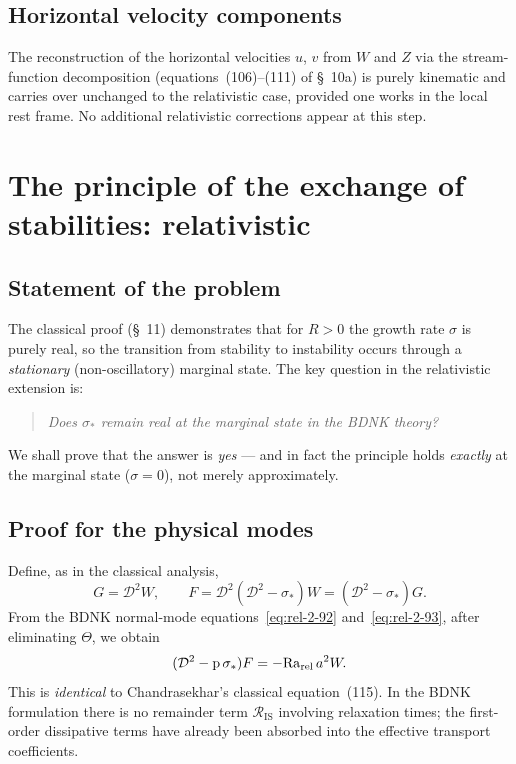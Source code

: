 \subsection{Horizontal velocity components}
\label{sec:rel-10e}

The reconstruction of the horizontal velocities $u$, $v$ from $W$ and $Z$ via
the stream-function decomposition (equations~(106)--(111) of \S~10a) is
purely kinematic and carries over unchanged to the relativistic case,
provided one works in the local rest frame.  No additional relativistic
corrections appear at this step.

\section{The principle of the exchange of stabilities: relativistic}
\label{sec:rel-11}

\subsection{Statement of the problem}
\label{sec:rel-11a}

The classical proof (\S~11) demonstrates that for $R > 0$ the growth
rate $\sigma$ is purely real, so the transition from stability to instability
occurs through a \emph{stationary} (non-oscillatory) marginal state.  The key
question in the relativistic extension is:

\begin{quote}
\emph{Does $\sigma_*$ remain real at the marginal state in the BDNK theory?}
\end{quote}

We shall prove that the answer is \emph{yes} --- and in fact the principle
holds \emph{exactly} at the marginal state ($\sigma = 0$), not merely
approximately.

\subsection{Proof for the physical modes}
\label{sec:rel-11b}

Define, as in the classical analysis,
\begin{equation}
\label{eq:rel-2-112}
G = \mathcal{D}^2 W, \qquad
F = \mathcal{D}^2(\mathcal{D}^2 - \sigma_*) W
  = (\mathcal{D}^2 - \sigma_*) G.
\end{equation}
From the BDNK normal-mode equations~\eqref{eq:rel-2-92}
and~\eqref{eq:rel-2-93}, after eliminating $\Theta$, we obtain
\begin{equation}
\label{eq:rel-2-115}
(\mathcal{D}^2 - \mathrm{p}\,\sigma_*) F
  = -\mathrm{Ra}_{\mathrm{rel}}\, a^2 W.
\end{equation}
This is \emph{identical} to Chandrasekhar's classical equation~(115).
In the BDNK formulation there is no remainder term
$\mathcal{R}_{\mathrm{IS}}$ involving relaxation times; the first-order
dissipative terms have already been absorbed into the effective transport
coefficients.

